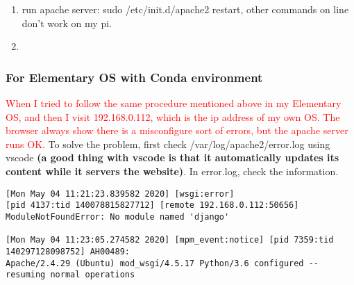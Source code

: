 \documentclass[UTF8,fancyhdr,a4paper]{ctexart}
\newcommand{\pflred}[1]{\textcolor{red}{#1}}
\begin{document}
\begin{enumerate}
            \begin{verbatim}
PermissionError at /ProcessPlot/
[Errno 13] Permission denied: 
'/home/pi/Desktop/website_venv/WebsiteProject/ProcessPlot/documents/YinYang.jpg'
Request Method:	POST
Request URL:	http://192.168.0.102/ProcessPlot/
Django Version:	2.2.12
Exception Type:	PermissionError
Exception Value:	
[Errno 13] Permission denied: 
'/home/pi/Desktop/website_venv/WebsiteProject/ProcessPlot/documents/YinYang.jpg'
Exception Location:	
/home/pi/Desktop/website_venv/lib/python3.5
/site-packages/django/core/files/storage.py in _save, line 266
Python Executable:	/home/pi/Desktop/website_venv/bin/python
Python Version:	3.5.3
Python Path:	
['/home/pi/Desktop/website_venv/WebsiteProject',
'/usr/lib/python35.zip',
'/usr/lib/python3.5',
'/usr/lib/python3.5/plat-arm-linux-gnueabihf',
'/usr/lib/python3.5/lib-dynload',
'/home/pi/Desktop/website_venv/lib/python3.5/site-packages']
Server time:	Sun, 3 May 2020 13:49:26 +0000
        \end{verbatim}
            \vspace{1mm}
            to solve this problem, use the following command:
            \begin{verbatim}
pi@raspberrypi:~/Desktop/website_venv $ 
chmod 664 WebsiteProject/sci_compute/static/sci_compute/img.png 
pi@raspberrypi:~/Desktop/website_venv $ 
sudo chown :www-data WebsiteProject/sci_compute/static/sci_compute/img.png 
        \end{verbatim}
            if you encounter other permission problems like database or a folder, use same operations, but for folder you have to use \textbf{chmod 775}.

      \item run apache server: sudo /etc/init.d/apache2 restart, other commands on line don't work on my pi.
      \item

\end{enumerate}

\subsubsection{For Elementary OS with Conda environment}
\pflred{When I tried to follow the same procedure mentioned above in my Elementary OS, and then I visit 192.168.0.112, which is the ip address of my own OS. The browser always show there is a misconfigure sort of errors, but the apache server runs OK.} To solve the problem, first check /var/log/apache2/error.log using vscode \textbf{(a good thing with vscode is that it automatically updates its content while it servers the website)}. In error.log, check the information.
\begin{verbatim}
[Mon May 04 11:21:23.839582 2020] [wsgi:error] 
[pid 4137:tid 140078815827712] [remote 192.168.0.112:50656] 
ModuleNotFoundError: No module named 'django'

[Mon May 04 11:23:05.274582 2020] [mpm_event:notice] [pid 7359:tid 140297128098752] AH00489: 
Apache/2.4.29 (Ubuntu) mod_wsgi/4.5.17 Python/3.6 configured -- resuming normal operations
\end{verbatim}
\end{document}
